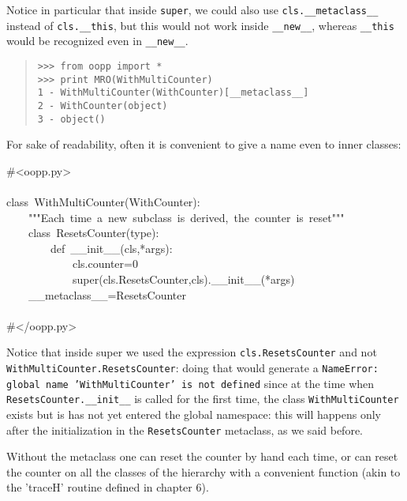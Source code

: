 \documentclass[10pt,english]{article}
\begin{document}
Notice in particular that inside \texttt{super}, we could also
use \texttt{cls.{\_}{\_}metaclass{\_}{\_}} instead of \texttt{cls.{\_}{\_}this}, but this
would not work inside \texttt{{\_}{\_}new{\_}{\_}}, whereas \texttt{{\_}{\_}this} would be
recognized even in \texttt{{\_}{\_}new{\_}{\_}}.
\begin{quote}
\begin{verbatim}>>> from oopp import *
>>> print MRO(WithMultiCounter)
1 - WithMultiCounter(WithCounter)[__metaclass__]
2 - WithCounter(object)
3 - object()\end{verbatim}
\end{quote}

For sake of readability, often it is convenient
to give a name even to inner classes:
\begin{ttfamily}\begin{flushleft}
\mbox{{\#}<oopp.py>}\\
\mbox{}\\
\mbox{class~WithMultiCounter(WithCounter):}\\
\mbox{~~~~"""Each~time~a~new~subclass~is~derived,~the~counter~is~reset"""}\\
\mbox{~~~~class~ResetsCounter(type):}\\
\mbox{~~~~~~~~def~{\_}{\_}init{\_}{\_}(cls,*args):}\\
\mbox{~~~~~~~~~~~~cls.counter=0}\\
\mbox{~~~~~~~~~~~~super(cls.ResetsCounter,cls).{\_}{\_}init{\_}{\_}(*args)}\\
\mbox{~~~~{\_}{\_}metaclass{\_}{\_}=ResetsCounter}\\
\mbox{}\\
\mbox{{\#}</oopp.py>}
\end{flushleft}\end{ttfamily}

Notice that inside super we used the expression \texttt{cls.ResetsCounter} and
not \texttt{WithMultiCounter.ResetsCounter}: doing that would generate a
\texttt{NameError: global name 'WithMultiCounter' is not defined} since at the
time when  \texttt{ResetsCounter.{\_}{\_}init{\_}{\_}} is called for the first time, 
the class \texttt{WithMultiCounter} exists but is has not yet entered the global
namespace: this will happens only after the initialization in the
\texttt{ResetsCounter} metaclass, as we said before.

Without the metaclass one can reset the counter by hand each time, or
can reset the counter on all the classes of the hierarchy with a
convenient function (akin to the 'traceH' routine defined in chapter 6).
\end{document}
